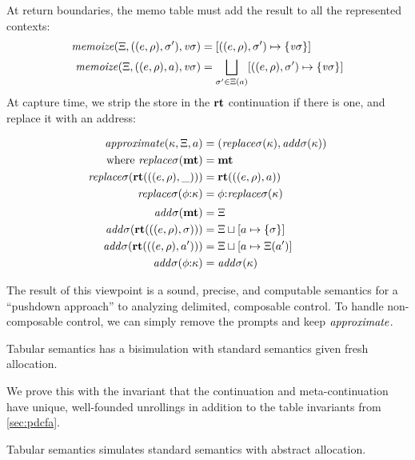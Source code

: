 At return boundaries, the memo table must add the result to all the represented contexts:
\begin{align*}
  \mathit{memoize}(\Xi, ((e,\rho), \sigma'), \mathit{v\sigma}) &=
  [((e,\rho), \sigma') \mapsto \{ {\mathit{v\sigma}} \}] \\
  \mathit{memoize}(\Xi, ((e,\rho), a), \mathit{v\sigma}) &=
  \bigsqcup\limits_{\sigma' \in \Xi(a)}[((e,\rho), \sigma') \mapsto \{ \mathit{v\sigma} \}]
\end{align*}
At capture time, we strip the store in the $\mathbf{rt}$ continuation if there is one, and replace it with an address:

\newcommand{\replacectx}{\mathit{replace}\mstore}
\newcommand{\addstore}{\mathit{add}\mstore}
\begin{align*}
  \approximate(\mkont, \mktab, \maddr) &= (\replacectx(\mkont), \addstore(\mkont)) \\
  \text{where }
   \replacectx(\kmt) &= \kmt \\
   \replacectx(\krt{((\mexpr,\menv),\_)}) &= \krt{((\mexpr,\menv),\maddr)} \\
   \replacectx(\kcons{\mkframe}{\mkont}) &= \kcons{\mkframe}{\replacectx(\mkont)}
  \\[2pt]
   \addstore(\kmt) &= \mktab \\
   \addstore(\krt{((\mexpr,\menv),\mstore)}) &= \joinone{\mktab}{\maddr}{\mstore} \\
   \addstore(\krt{((\mexpr,\menv),\maddr')}) &= \joinm{\mktab}{\maddr}{\mktab(\maddr')} \\
   \addstore(\kcons{\mkframe}{\mkont}) &= \addstore(\mkont)
\end{align*}

The result of this viewpoint is a sound, precise, and computable semantics for a ``pushdown approach'' to analyzing delimited, composable control.
%
To handle non-composable control, we can simply remove the prompts and keep $\mathit{approximate}$.

\begin{conjecture}\label{thm:concrete-sr}
  Tabular semantics has a bisimulation with standard semantics given fresh allocation.
\end{conjecture}

We prove this with the invariant that the continuation and meta-continuation have unique, well-founded unrollings in addition to the table invariants from \autoref{sec:pdcfa}.

\begin{conjecture}\label{thm:sound-sr}
  Tabular semantics simulates standard semantics with abstract allocation.
\end{conjecture}

